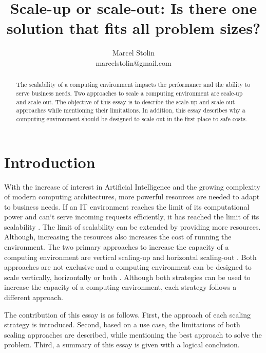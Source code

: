 \documentclass{article}
\title{Scale-up or scale-out: Is there one solution that fits all problem sizes?}
\date{}
\author{Marcel Stolin \\ marcelstolin@gmail.com}
\begin{document}
\maketitle


\begin{abstract}
The scalability of a computing environment impacts the performance and the ability to serve business needs. Two approaches to scale a computing environment are scale-up and scale-out. The objective of this essay is to describe the scale-up and scale-out approaches while mentioning their limitations. In addition, this essay describes why a computing environment should be designed to scale-out in the first place to safe costs.
\end{abstract}


\section{Introduction} \label{s_intro}
With the increase of interest in Artificial Intelligence and the growing complexity of modern computing architectures, more powerful resources are needed to adapt to business needs. If an IT environment reaches the limit of its computational power and can`t serve incoming requests efficiently, it has reached the limit of its scalability \cite{Wilder2012CloudPatterns}. The limit of scalability can be extended by providing more resources. Although, increasing the resources also increases the cost of running the environment.
The two primary approaches to increase the capacity of a computing environment are vertical scaling-up and horizontal scaling-out \cite{Abbott2015ScalabilityArt}. Both approaches are not exclusive and a computing environment can be designed to scale vertically, horizontally or both \cite{Wilder2012CloudPatterns}.
Although both strategies can be used to increase the capacity of a computing environment, each strategy follows a different approach.


The contribution of this essay is as follows. First, the approach of each scaling strategy is introduced. Second, based on a use case, the limitations of both scaling approaches are described, while mentioning the best approach to solve the problem. Third, a summary of this essay is given with a logical conclusion.
\end{document}
